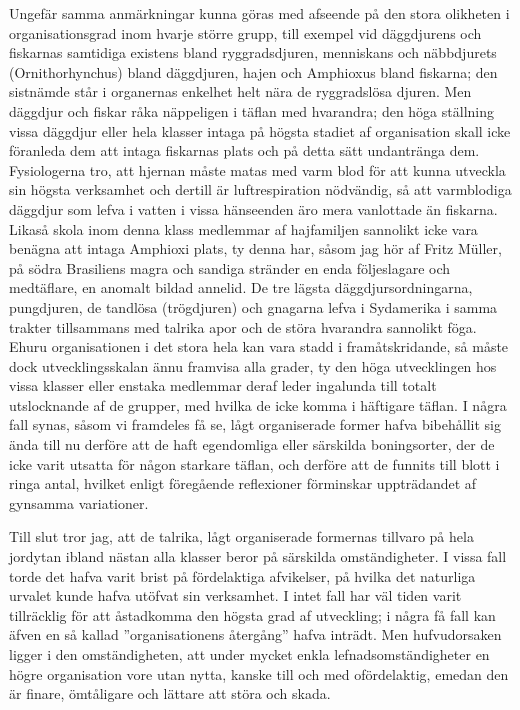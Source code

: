 Ungefär samma anmärkningar kunna göras med afseende på den stora olikheten i organisationsgrad inom hvarje större grupp, till exempel vid däggdjurens och fiskarnas samtidiga existens bland ryggradsdjuren, menniskans och näbbdjurets (Ornithorhynchus) bland däggdjuren, hajen och Amphioxus bland fiskarna; den sistnämde står i organernas enkelhet helt nära de ryggradslösa djuren. Men däggdjur och fiskar råka näppeligen i täflan med hvarandra; den höga ställning vissa däggdjur eller hela klasser intaga på högsta stadiet af organisation skall icke föranleda dem att intaga fiskarnas plats och på detta sätt undantränga dem. Fysiologerna tro, att hjernan måste matas med varm blod för att kunna utveckla sin högsta verksamhet och dertill är luftrespiration nödvändig, så att varmblodiga däggdjur som lefva i vatten i vissa hänseenden äro mera vanlottade än fiskarna. Likaså skola inom denna klass medlemmar af hajfamiljen sannolikt icke vara benägna att intaga Amphioxi plats, ty denna har, såsom jag hör af Fritz Müller, på södra Brasiliens magra och sandiga stränder en enda följeslagare och medtäflare, en anomalt bildad annelid. De tre lägsta däggdjursordningarna, pungdjuren, de tandlösa (trögdjuren) och gnagarna lefva i Sydamerika i samma trakter tillsammans med talrika apor och de störa hvarandra sannolikt föga. Ehuru organisationen i det stora hela kan vara stadd i framåtskridande, så måste dock utvecklingsskalan ännu framvisa alla grader, ty den höga utvecklingen hos vissa klasser eller enstaka medlemmar deraf leder ingalunda till totalt utslocknande af de grupper, med hvilka de icke komma i häftigare täflan. I några fall synas, såsom vi framdeles få se, lågt organiserade former hafva bibehållit sig ända till nu derföre att de haft egendomliga eller särskilda boningsorter, der de icke varit utsatta för någon starkare täflan, och derföre att de funnits till blott i ringa antal, hvilket enligt föregående reflexioner förminskar uppträdandet af gynsamma variationer.

Till slut tror jag, att de talrika, lågt organiserade formernas tillvaro på hela jordytan ibland nästan alla klasser beror på särskilda omständigheter. I vissa fall torde det hafva varit brist på fördelaktiga afvikelser, på hvilka det naturliga urvalet kunde hafva utöfvat sin verksamhet. I intet fall har väl tiden varit tillräcklig för att åstadkomma den högsta grad af utveckling; i några få fall kan äfven en så kallad ”organisationens återgång” hafva inträdt. Men hufvudorsaken ligger i den omständigheten, att under mycket enkla lefnadsomständigheter en högre organisation vore utan nytta, kanske till och med ofördelaktig, emedan den är finare, ömtåligare och lättare att störa och skada.

